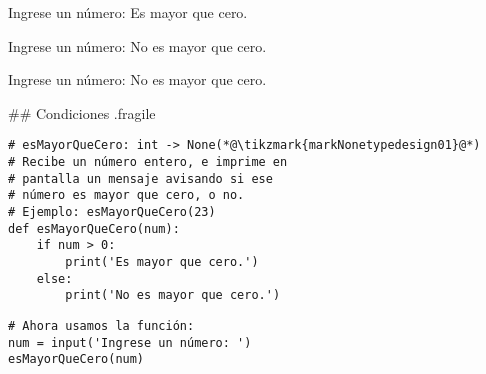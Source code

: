 
\vspace{-1ex}


\begin{exampleConsole}
Ingrese un número: 
Es mayor que cero.
\end{exampleConsole}

\fullrule


\begin{exampleConsole}
Ingrese un número: 
No es mayor que cero.
\end{exampleConsole}

\fullrule


\begin{exampleConsole}
Ingrese un número: 
No es mayor que cero.
\end{exampleConsole}

\trmcolumns

## Condiciones {.fragile}


\begin{lstlisting}[style=frame02,linewidth=.65\textwidth]
# esMayorQueCero: int -> None(*@\tikzmark{markNonetypedesign01}@*)
# Recibe un número entero, e imprime en
# pantalla un mensaje avisando si ese
# número es mayor que cero, o no.
# Ejemplo: esMayorQueCero(23)
def esMayorQueCero(num):
    if num > 0:
        print('Es mayor que cero.')
    else:
        print('No es mayor que cero.')
\end{lstlisting}

\pause


\pause

\vspace{-1ex}
\bgncolumns
{}


\begin{lstlisting}
# Ahora usamos la función: 
num = input('Ingrese un número: ')
esMayorQueCero(num)
\end{lstlisting}

